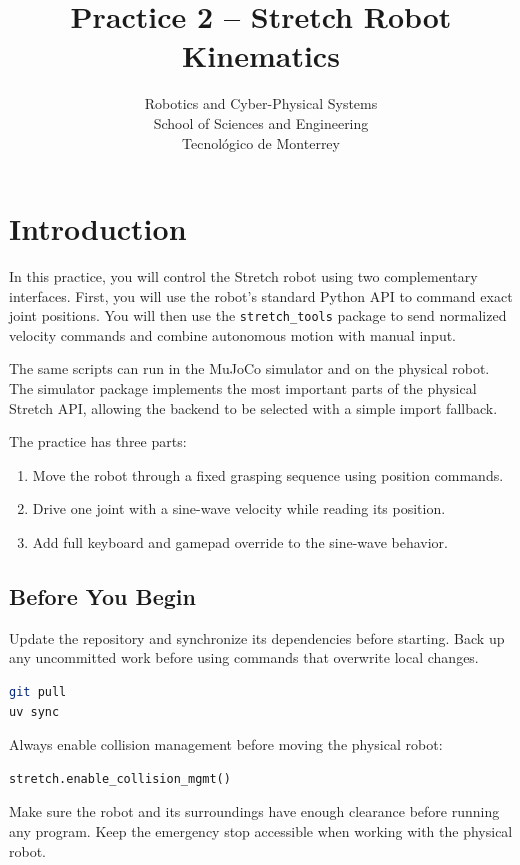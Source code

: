 \documentclass[11pt,a4paper]{article}
\title{\textbf{Practice 2 -- Stretch Robot Kinematics}}
\author{
    Robotics and Cyber-Physical Systems \\
    School of Sciences and Engineering \\
    Tecnol\'ogico de Monterrey
}
\date{}
\begin{document}
\maketitle

\section*{Introduction}

In this practice, you will control the Stretch robot using two complementary
interfaces. First, you will use the robot's standard Python API to command exact
joint positions. You will then use the \texttt{stretch\_tools} package to send
normalized velocity commands and combine autonomous motion with manual input.

The same scripts can run in the MuJoCo simulator and on the physical robot. The
simulator package implements the most important parts of the physical Stretch
API, allowing the backend to be selected with a simple import fallback.

The practice has three parts:

\begin{enumerate}
    \item Move the robot through a fixed grasping sequence using position commands.
    \item Drive one joint with a sine-wave velocity while reading its position.
    \item Add full keyboard and gamepad override to the sine-wave behavior.
\end{enumerate}

\subsection*{Before You Begin}

Update the repository and synchronize its dependencies before starting. Back up
any uncommitted work before using commands that overwrite local changes.

\begin{lstlisting}[language=bash]
git pull
uv sync
\end{lstlisting}

Always enable collision management before moving the physical robot:

\begin{lstlisting}[language=Python]
stretch.enable_collision_mgmt()
\end{lstlisting}

Make sure the robot and its surroundings have enough clearance before running
any program. Keep the emergency stop accessible when working with the physical
robot.
\end{document}
